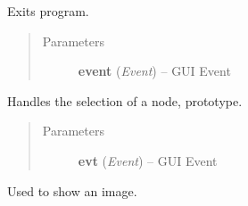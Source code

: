 \documentclass[letterpaper,10pt,english]{sphinxmanual}
\begin{document}
\begin{fulllineitems}
\begin{fulllineitems}
\begin{quote}
\begin{description}
\end{description}\end{quote}

\end{fulllineitems}


\begin{fulllineitems}
\label{graphicaldesign:graphicaldesign.GUItemplate.OnExit}
Exits program.
\begin{quote}\begin{description}
\item[{Parameters}] \leavevmode
\textbf{event} (\emph{Event}) -- GUI Event

\end{description}\end{quote}

\end{fulllineitems}


\begin{fulllineitems}
\label{graphicaldesign:graphicaldesign.GUItemplate.SelectNode}
Handles the selection of a node, prototype.
\begin{quote}\begin{description}
\item[{Parameters}] \leavevmode
\textbf{evt} (\emph{Event}) -- GUI Event

\end{description}\end{quote}

\end{fulllineitems}


\end{fulllineitems}


\begin{fulllineitems}
\label{graphicaldesign:graphicaldesign.ImageViewer}
Used to show an image.

\end{fulllineitems}

\end{document}

